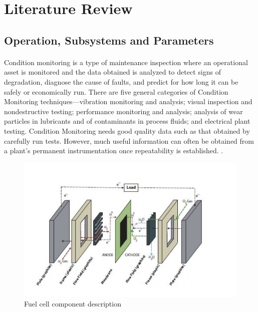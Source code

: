 \section{Literature Review}
\subsection{ Operation, Subsystems and Parameters}
\paragraph{}Condition monitoring is a type of maintenance inspection where an operational asset is monitored and the data obtained is analyzed to detect signs of degradation, diagnose the cause of faults, and predict for how long it can be safely or economically run. There are five general categories of Condition Monitoring techniques—vibration monitoring and analysis; visual inspection and nondestructive testing; performance monitoring and analysis; analysis of wear particles in lubricants and of contaminants in process fluids; and electrical plant testing.  Condition Monitoring needs good quality data such as that obtained by carefully run tests. However, much useful information can often be obtained from a plant's permanent instrumentation once repeatability is established.
\cite{thanapalan_model_2011}.
\begin{figure}[!h]
\includegraphics{Figures/Figure5}
\caption{Fuel cell component description
\cite{stefanopoulou_mechatronics_nodate}}
\end{figure} 
